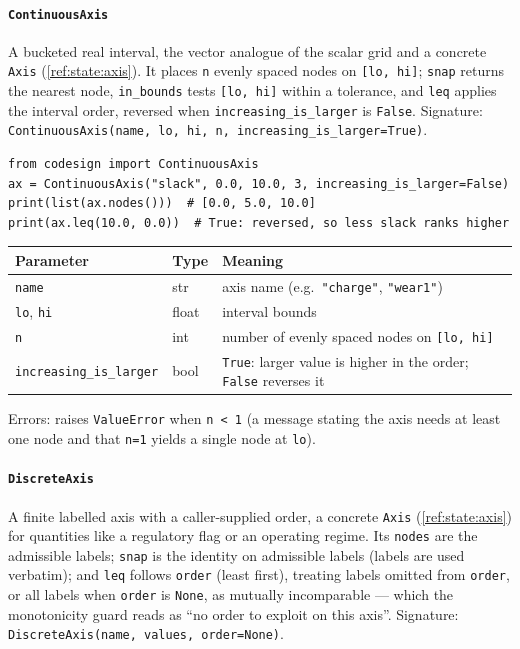 \documentclass[11pt,a4paper]{article}
\begin{document}
\paragraph{\texttt{ContinuousAxis}}\label{ref:state:continuousaxis}
A bucketed real interval, the vector analogue of the scalar grid and a
concrete \texttt{Axis} (\ref{ref:state:axis}). It places \texttt{n} evenly
spaced nodes on \texttt{[lo, hi]}; \texttt{snap} returns the nearest node,
\texttt{in\_bounds} tests \texttt{[lo, hi]} within a tolerance, and
\texttt{leq} applies the interval order, reversed when
\texttt{increasing\_is\_larger} is \texttt{False}.
Signature: \texttt{ContinuousAxis(name, lo, hi, n,
increasing\_is\_larger=True)}.

\begin{lstlisting}
from codesign import ContinuousAxis
ax = ContinuousAxis("slack", 0.0, 10.0, 3, increasing_is_larger=False)
print(list(ax.nodes()))  # [0.0, 5.0, 10.0]
print(ax.leq(10.0, 0.0))  # True: reversed, so less slack ranks higher
\end{lstlisting}

\begin{center}
\begin{tabular}{@{}llp{}@{}}
\toprule
Parameter & Type & Meaning \\
\midrule
\texttt{name} & str & axis name (e.g.\ \texttt{"charge"}, \texttt{"wear1"}) \\
\texttt{lo}, \texttt{hi} & float & interval bounds \\
\texttt{n} & int & number of evenly spaced nodes on \texttt{[lo, hi]} \\
\texttt{increasing\_is\_larger} & bool & \texttt{True}: larger value is
  higher in the order; \texttt{False} reverses it \\
\bottomrule
\end{tabular}
\end{center}
Errors: raises \texttt{ValueError} when \texttt{n < 1} (a message stating the
axis needs at least one node and that \texttt{n=1} yields a single node at
\texttt{lo}).

\paragraph{\texttt{DiscreteAxis}}\label{ref:state:discreteaxis}
A finite labelled axis with a caller-supplied order, a concrete
\texttt{Axis} (\ref{ref:state:axis}) for quantities like a regulatory flag
or an operating regime. Its \texttt{nodes} are the admissible labels;
\texttt{snap} is the identity on admissible labels (labels are used
verbatim); and \texttt{leq} follows \texttt{order} (least first), treating
labels omitted from \texttt{order}, or all labels when \texttt{order} is
\texttt{None}, as mutually incomparable --- which the monotonicity guard
reads as ``no order to exploit on this axis''.
Signature: \texttt{DiscreteAxis(name, values, order=None)}.
\end{document}
